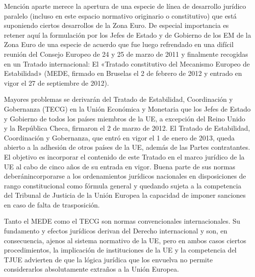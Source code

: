 \documentclass[10pt,a4paper]{article}
\begin{document}
Mención aparte merece la apertura de una especie de línea de desarrollo jurídico paralelo (incluso en este espacio normativo originario o constitutivo) que está suponiendo ciertos desarrollos de la Zona Euro. De especial importancia es retener aquí la formulación por los Jefes de Estado y de Gobierno de los EM de la Zona Euro de una especie de acuerdo que fue luego refrendado en una difícil reunión del Consejo Europeo de 24 y 25 de marzo de 2011 y finalmente recogidas en un Tratado internacional: El «Tratado constitutivo del Mecanismo Europeo de Estabilidad» (MEDE, firmado en Bruselas el 2 de febrero de 2012 y entrado en vigor el 27 de septiembre de 2012).

Mayores problemas se derivarán del Tratado de Estabilidad, Coordinación y Gobernanza (TECG) en la Unión Económica y Monetaria que los Jefes de Estado y Gobierno de todos los países miembros de la UE, a excepción del Reino Unido y la República Checa, firmaron el 2 de marzo de 2012. El Tratado de Estabilidad, Coordinación y Gobernanza, que entró en vigor el 1 de enero de 2013, queda abierto a la adhesión de otros países de la UE, además de las Partes contratantes. El objetivo es incorporar el contenido de este Tratado en el marco jurídico de la UE al cabo de cinco años de su entrada en vigor. Buena parte de sus normas deberánincorporarse a los ordenamientos jurídicos nacionales en disposiciones de rango constitucional como fórmula general y quedando sujeta a la competencia del Tribunal de Justicia de la Unión Europea la capacidad de imponer sanciones en caso de falta de trasposición. 

Tanto el MEDE como el TECG son normas convencionales internacionales. Su fundamento y efectos jurídicos derivan del Derecho internacional y son, en consecuencia, ajenos al sistema normativo de la UE, pero en ambos casos ciertos procedimientos, la implicación de instituciones de la UE y la competencia del TJUE advierten de que la lógica jurídica que los envuelva no permite considerarlos absolutamente extraños a la Unión Europea.
\end{document}
